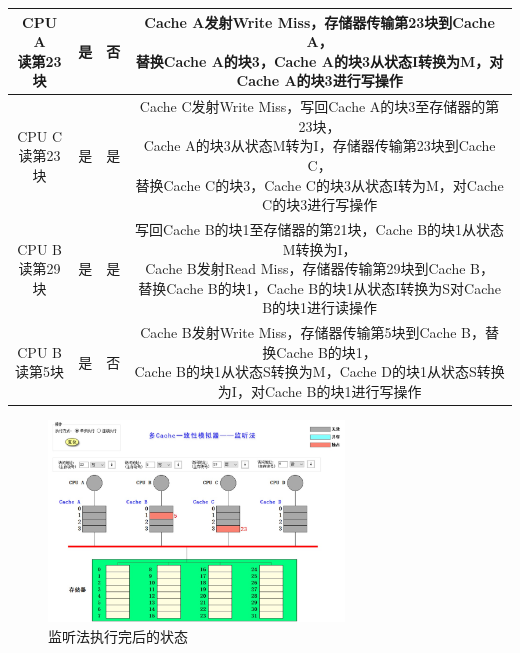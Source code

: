 \documentclass[UTF8]{article}
\begin{document}
\begin{table}[H]
{\begin{tabular}{c c c c}
            \hline
            \makecell[c]{CPU A\\读第23块} & 是 & 否 & \makecell[c]{Cache A发射Write Miss，存储器传输第23块到Cache A，\\替换Cache A的块3，Cache A的块3从状态I转换为M，对Cache A的块3进行写操作} \\
            \hline
            \makecell[c]{CPU C\\读第23块} & 是 & 是 & \makecell[c]{Cache C发射Write Miss，写回Cache A的块3至存储器的第23块，\\Cache A的块3从状态M转为I，存储器传输第23块到Cache C，\\替换Cache C的块3，Cache C的块3从状态I转为M，对Cache C的块3进行写操作} \\
            \hline
            \makecell[c]{CPU B\\读第29块} & 是 & 是 & \makecell[c]{写回Cache B的块1至存储器的第21块，Cache B的块1从状态M转换为I，\\Cache B发射Read Miss，存储器传输第29块到Cache B，\\替换Cache B的块1，Cache B的块1从状态I转换为S对Cache B的块1进行读操作} \\
            \hline
            \makecell[c]{CPU B\\读第5块} & 是 & 否 & \makecell[c]{Cache B发射Write Miss，存储器传输第5块到Cache B，替换Cache B的块1，\\Cache B的块1从状态S转换为M，Cache D的块1从状态S转换为I，对Cache B的块1进行写操作} \\
            \hline
        \end{tabular}
        }
    \end{table}
    \begin{figure}[H]
        \centering
        \includegraphics[width=0.7\textwidth]{./fig/snooping/end.jpg}
        \caption{监听法执行完后的状态}
    \end{figure}
\end{document}
